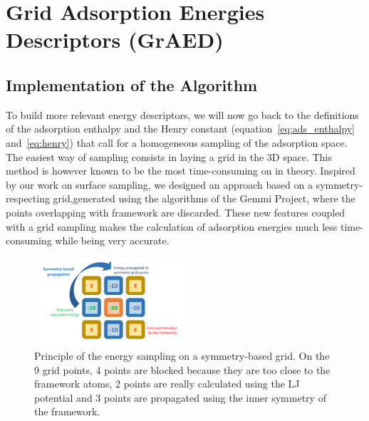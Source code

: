\documentclass[main]{subfiles}
\begin{document}
\section{Grid Adsorption Energies Descriptors (GrAED)}

\subsection{Implementation of the Algorithm}

To build more relevant energy descriptors, we will now go back to the definitions of the adsorption enthalpy and the Henry constant (equation~\ref{eq:ads_enthalpy} and~\ref{eq:henry}) that call for a homogeneous sampling of the adsorption space. The easiest way of sampling consists in laying a grid in the 3D space. This method is however known to be the most time-consuming on in theory. Inspired by our work on surface sampling, we designed an approach based on a symmetry-respecting grid,generated using the algorithms of the Gemmi Project,\cite{Wojdyr_2022} where the points overlapping with framework are discarded. These new features coupled with a grid sampling makes the calculation of adsorption energies much less time-consuming while being very accurate.

\begin{figure}[ht]
  \centering
    \includegraphics[width=0.5\textwidth]{figures/3-fastsim/grid_sampling.pdf}
    \caption{Principle of the energy sampling on a symmetry-based grid. On the 9 grid points, 4 points are blocked because they are too close to the framework atoms, 2 points are really calculated using the LJ potential and 3 points are propagated using the inner symmetry of the framework.}\label{fgr:principle_grid}
\end{figure}
\end{document}
